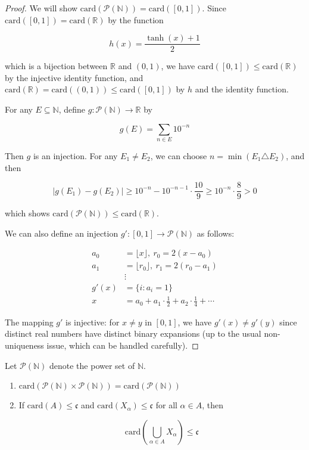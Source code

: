 \begin{proof}
    We will show $\mathrm{card}(\mathcal{P}(\mathbb{N})) = \mathrm{card}([0,1])$. Since $\mathrm{card}([0,1]) = \mathrm{card}(\mathbb{R})$ by the function

    \[
        h(x) = \frac{\tanh(x) + 1}{2}
    \]

    which is a bijection between $\mathbb{R}$ and $(0,1)$, we have $\mathrm{card}([0,1]) \le \mathrm{card}(\mathbb{R})$
    by the injective identity function, and $\mathrm{card}(\mathbb{R}) = \mathrm{card}((0,1)) \le \mathrm{card}([0,1])$ 
    by $h$ and the identity function.

    For any $E \subseteq \mathbb{N}$, define $g: \mathcal{P}(\mathbb{N}) \to \mathbb{R}$ by

    \[
        g(E) = \sum_{n \in E} 10^{-n}
    \]

    Then $g$ is an injection. For any $E_1 \ne E_2$, we can choose $n = \min ( E_1 \triangle E_2 )$, and then
    
    \[
        \left| g(E_1) - g(E_2)\right| \ge 10^{-n} - 10^{-n-1} \cdot \frac{10}{9} \ge 10^{-n} \cdot \frac{8}{9} > 0
    \]

    which shows $\mathrm{card}(\mathcal{P}(\mathbb{N})) \le \mathrm{card}(\mathbb{R})$.

    We can also define an injection $g': [0,1] \to \mathcal{P}(\mathbb{N})$ as follows:

    \begin{align*}
        a_0 &= \lfloor x \rfloor,\: r_0 = 2(x - a_0) \\
        a_1 &= \lfloor r_0 \rfloor,\: r_1 = 2(r_0 - a_1) \\
        &\vdots \\
        g'(x) &= \{ i: a_i = 1 \} \\
        x &= a_0  + a_1 \cdot \frac{1}{2} + a_2 \cdot \frac{1}{4} + \cdots
    \end{align*}

    The mapping $g'$ is injective: for $x \neq y$ in $[0,1]$, we have $g'(x) \neq g'(y)$ since distinct real numbers have distinct binary expansions (up to the usual non-uniqueness issue, which can be handled carefully).

\end{proof}

\begin{thm}
    Let $\mathcal{P}(\mathbb{N})$ denote the power set of $\mathbb{N}$.

    \begin{enumerate}
        \item $\mathrm{card}(\mathcal{P}(\mathbb{N}) \times \mathcal{P}(\mathbb{N})) = \mathrm{card}(\mathcal{P}(\mathbb{N}))$

        \item If $\mathrm{card}(A) \le \mathfrak{c}$ and $\mathrm{card}(X_{\alpha}) \le \mathfrak{c}$ for all $\alpha \in A$, then 
        
        \[
        \mathrm{card} \left( \bigcup_{\alpha \in A} X_{\alpha} \right) \le \mathfrak{c} 
        \]
        
    \end{enumerate}
\end{thm}

